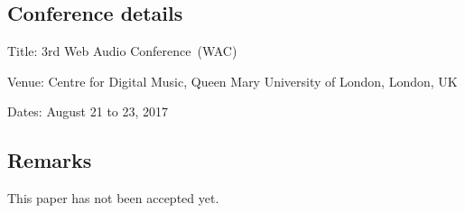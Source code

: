 \subsection*{Conference details}

Title: 3rd Web Audio Conference~(WAC)

Venue: Centre for Digital Music, Queen Mary University of London, London, UK

Dates: August 21 to 23, 2017

\subsection*{Remarks}

This paper has not been accepted yet.


